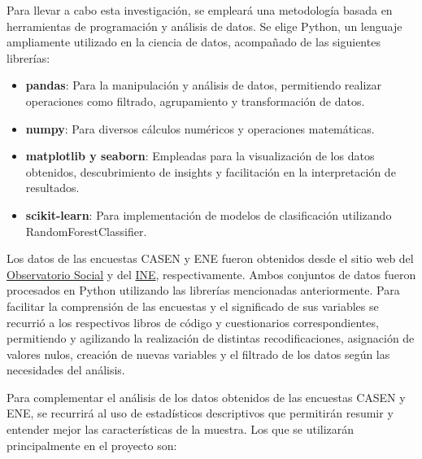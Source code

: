 

Para llevar a cabo esta investigación, se empleará una metodología basada en herramientas de programación y análisis de datos. Se elige Python, un lenguaje ampliamente utilizado en la ciencia de datos, acompañado de las siguientes librerías:

\begin{itemize}
	\item \textbf{pandas}: Para la manipulación y análisis de datos, permitiendo realizar operaciones como filtrado, agrupamiento y transformación de datos.
	\item \textbf{numpy}: Para diversos cálculos numéricos y operaciones matemáticas.
	\item \textbf{matplotlib y seaborn}: Empleadas para la visualización de los datos obtenidos, descubrimiento de insights y facilitación en la interpretación de resultados.
	\item \textbf{scikit-learn}: Para implementación de modelos de clasificación utilizando RandomForestClassifier.
\end{itemize}

Los datos de las encuestas CASEN y ENE fueron obtenidos desde el sitio web del \href{https://observatorio.ministeriodesarrollosocial.gob.cl/encuesta-casen-2022}{Observatorio Social} y del \href{https://www.ine.gob.cl/estadisticas/sociales/mercado-laboral/ocupacion-y-desocupacion}{INE}, respectivamente. Ambos conjuntos de datos fueron procesados en Python utilizando las librerías mencionadas anteriormente. Para facilitar la comprensión de las encuestas y el significado de sus variables se recurrió a los respectivos libros de código y cuestionarios correspondientes, permitiendo y agilizando la realización de distintas recodificaciones, asignación de valores nulos, creación de nuevas variables y el filtrado de los datos según las necesidades del análisis. 

Para complementar el análisis de los datos obtenidos de las encuestas CASEN y ENE, se recurrirá al uso de estadísticos descriptivos que permitirán resumir y entender mejor las características de la muestra. Los que se utilizarán principalmente en el proyecto son:

